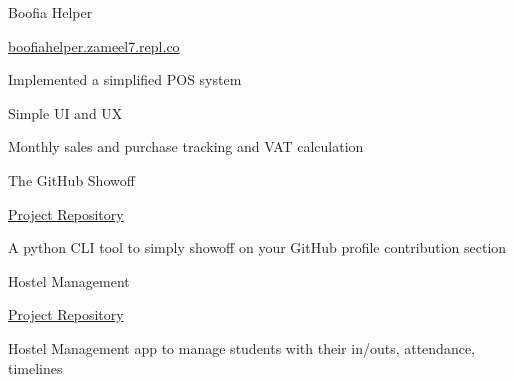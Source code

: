 \begin{cventries}
    \cventry
    {} %
    {Boofia Helper} %
    {} %
    {} %
    {
      \begin{cvitems} %
        \item {\hyperlink{boofiahelper.zameel7.repl.co}{boofiahelper.zameel7.repl.co}}
      	\item {Implemented a simplified POS system}
       \item {Simple UI and UX}
       \item {Monthly sales and purchase tracking and VAT calculation}
      \end{cvitems}
    }

    \cventry
    {} %
    {The GitHub Showoff} %
    {} %
    {} %
    {
      \begin{cvitems} %
        \item {\hyperlink{https://github.com/rabeeh-ta/the-github-showoff.git}{Project Repository}}
      	\item {A python CLI tool to simply showoff on your GitHub profile contribution section}
      \end{cvitems}
    }

    \cventry
    {} %
    {Hostel Management} %
    {} %
    {} %
    {
      \begin{cvitems} %
        \item {\hyperlink{https://hostel-app-frontend.vercel.app/authentication/sign-in}{Project Repository}}
      	\item {Hostel Management app to manage students with their in/outs, attendance, timelines}
      \end{cvitems}
    }
\end{cventries}